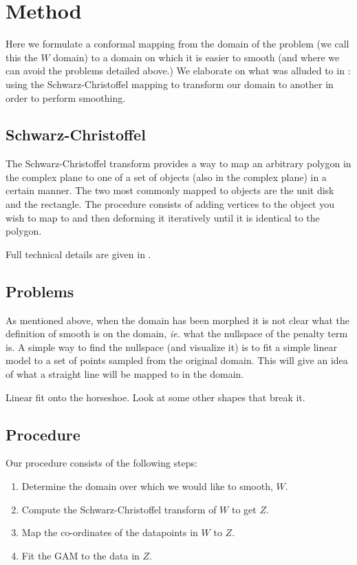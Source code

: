 \documentclass[a4paper,10pt]{amsart}
\newcommand{\sch}{Schwarz-Christoffel }
\begin{document}
\section{Method}

Here we formulate a conformal mapping from the domain of the problem (we call this the $W$ domain) to a domain on which it is easier to smooth (and where we can avoid the problems detailed above.) We elaborate on what was alluded to in \cite{eilerstalk}: using the \sch mapping to transform our domain to another in order to perform smoothing.

\subsection{\sch}

The \sch transform provides a way to map an arbitrary polygon in the complex plane to one of a set of objects (also in the complex plane) in a certain manner. The two most commonly mapped to objects are the unit disk and the rectangle. The procedure consists of adding vertices to the object you wish to map to and then deforming it iteratively until it is identical to the polygon.

Full technical details are given in \cite{miller08}.


\subsection{Problems}

As mentioned above, when the domain has been morphed it is not clear what the definition of smooth is on the domain, \emph{ie.} what the nullspace of the penalty term is. A simple way to find the nullspace (and visualize it) is to fit a simple linear model to a set of points sampled from the original domain. This will give an idea of what a straight line will be mapped to in the domain.


Linear fit onto the horseshoe.
Look at some other shapes that break it.



\subsection{Procedure}

Our procedure consists of the following steps:

\begin{enumerate}
\item Determine the domain over which we would like to smooth, $W$.

\item Compute the \sch transform of $W$ to get $Z$.

\item Map the co-ordinates of the datapoints in $W$ to $Z$.

\item Fit the GAM to the data in $Z$.

\end{enumerate}
\end{document}
